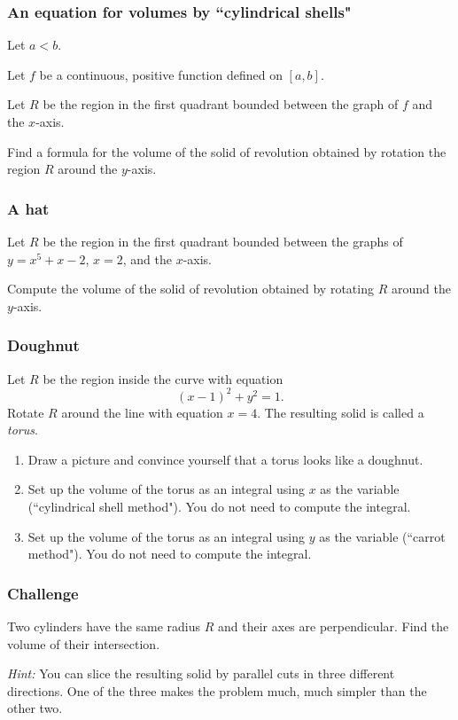 \documentclass[14pt]{beamer}
\begin{document}
\begin{frame}[t]
	\frametitle{An equation for volumes by ``cylindrical shells"}

	Let $a < b$.

	Let $f$ be a continuous, positive function defined on $[a,b]$.

	Let $R$ be the region in the first quadrant bounded between the graph of $f$ and
	the $x$-axis.

	Find a formula for the volume of the solid of revolution obtained by rotation the
	region $R$ around the $y$-axis.
\end{frame}

\begin{frame}[t]
	\frametitle{A hat}

	Let $R$ be the region in the first quadrant bounded between the graphs of
	$\displaystyle y=x^{5}+x-2$, $\displaystyle x=2$, and the $\displaystyle x$-axis.

	Compute the volume of the solid of revolution obtained by rotating $R$ around
	the $y$-axis.
\end{frame}

\begin{frame}[t]
	\fontsize{13}{13}\selectfont
	\frametitle{Doughnut}

	Let $R$ be the region inside the curve with equation
	\[
		(x-1)^{2}+ y^{2}=1.
	\]
	Rotate $R$ around the line with equation $\displaystyle x=4$. The resulting
	solid is called a \emph{torus}.

	\begin{enumerate}
		\item Draw a picture and convince yourself that a torus looks like a doughnut.

		\item Set up the volume of the torus as an integral using $x$ as the variable
			(``cylindrical shell method"). You do not need to compute the integral.

		\item Set up the volume of the torus as an integral using $y$ as the variable
			(``carrot method"). You do not need to compute the integral.
	\end{enumerate}
\end{frame}

\begin{frame}[t]
	\frametitle{Challenge}

	Two cylinders have the same radius $R$ and their axes are perpendicular. Find the
	volume of their intersection.

	\emph{Hint:} You can slice the resulting solid by parallel cuts in three
	different directions. One of the three makes the problem much, much simpler
	than the other two.
\end{frame}
\end{document}

